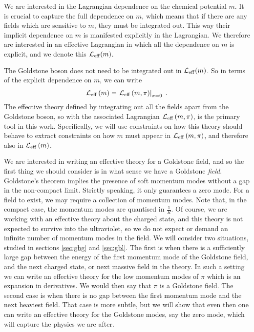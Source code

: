 \documentclass[11pt]{article}
\numberwithin{equation}{section}
\newcommand{\be}{\begin{equation}} \newcommand{\ee}{\end{equation}}
\begin{document}
We are interested in the Lagrangian dependence on the chemical potential $m$. It is crucial to capture the full dependence on $m$, which means that if there are any fields which are sensitive to $m$, they must be integrated out. This way their implicit dependence on $m$ is manifested explicitly in the Lagrangian. We therefore are interested in an effective Lagrangian in which all the dependence on $m$ is explicit, and we denote this ${\cal L}_{\mathrm{eff}}(m)$. 

The Goldstone boson does not need to be integrated out in ${\cal L}_{\mathrm{eff}}(m)$. So in terms of the explicit dependence on $m$, we can write 
\be
{\cal L}_{\mathrm{eff}}\left(m\right)  = \left.{\cal L}_{\mathrm{eff}}\left(m,\pi\right) \right|_{\pi=0} \;.
\label{leffmpieq0}
\ee
The effective theory defined by integrating out all the fields apart from the Goldstone boson, so with the associated Lagrangian ${\cal L}_{\mathrm{eff}}\left(m,\pi\right)$, is the primary tool in this work. Specifically, we will use constraints on how this theory should behave to extract constraints on how $m$ must appear in ${\cal L}_{\mathrm{eff}}\left(m,\pi\right)$, and therefore also in ${\cal L}_{\mathrm{eff}}\left(m\right)$.

We are interested in writing an effective theory for a Goldstone field, and so the first thing we should consider is in what sense we have a Goldstone {\it field}. Goldstone's theorem implies the presence of soft momentum modes without a gap in the non-compact limit. Strictly speaking, it only guarantees a zero mode. For a field to exist, we may require a collection of momentum modes. Note that, in the compact case, the momentum modes are quantised in $\frac{1}{R}$. Of course, we are working with an effective theory about the charged state, and this theory is not expected to survive into the ultraviolet, so we do not expect or demand an infinite number of momentum modes in the field. We will consider two situations, studied in sections \ref{sec:gbg} and \ref{sec:gbl}. The first is when there is a sufficiently large gap between the energy of the first momentum mode of the Goldstone field, and the next charged state, or next massive field in the theory. In such a setting we can write an effective theory for the low momentum modes of $\pi$ which is an expansion in derivatives. We would then say that $\pi$ is a Goldstone field. The second case is when there is no gap between the first momentum mode and the next heaviest field. That case is more subtle, but we will show that even then one can write an effective theory for the Goldstone modes, say the zero mode, which will capture the physics we are after. 
\end{document}
